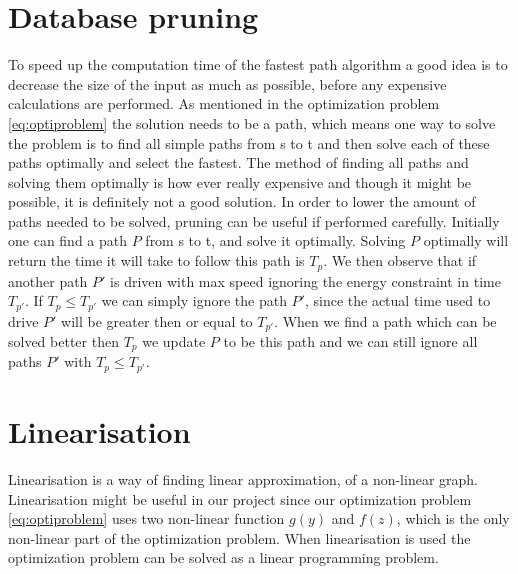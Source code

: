 \section{Database pruning}
To speed up the computation time of the fastest path algorithm a good idea is to decrease the size of the input as much as possible, before any expensive calculations are performed. As mentioned in the optimization problem \ref{eq:optiproblem} the solution needs to be a path, which means one way to solve the problem is to find all simple paths from s to t and then solve each of these paths optimally and select the fastest. The method of finding all paths and solving them optimally is how ever really expensive and though it might be possible, it is definitely not a good solution. In order to lower the amount of paths needed to be solved, pruning can be useful if performed carefully.  
Initially one can find a path $P$ from s to t, and solve it optimally. Solving 
$P$ optimally will return the time it will take to follow this path is $T_p$. We then 
observe that if another path $P'$ is driven with max speed ignoring the energy constraint in time $T_{p'}$. If $T_p \leq T_{p'}$ we can simply ignore the path $P'$, since the actual time used to drive $P'$ will be greater then or equal to $T_{p'}$.
When we find a path which can be solved better then $T_p$ we update $P$ to be this path and we can still ignore all paths $P'$ with $T_p \leq T_{p'}$. 

\section{Linearisation}
Linearisation is a way of finding linear approximation, of a non-linear graph. Linearisation might be useful in our project since our optimization problem \ref{eq:optiproblem} uses two non-linear function $g(y)$ and $f(z)$, which is the only non-linear part of the optimization problem. When linearisation is used the optimization problem can be solved as a linear programming problem. 